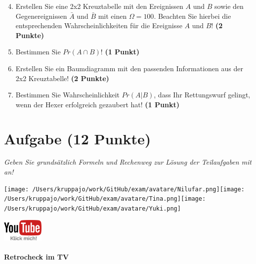 \documentclass[a4paper, 9pt]{scrartcl}\usepackage[]{graphicx}\usepackage[]{xcolor}
\begin{document}
\begin{enumerate}
  \setcounter{enumi}{3}
\item Erstellen Sie eine 2x2 Kreuztabelle mit den Ereignissen $A$ und $B$ sowie den Gegenereignissen $\bar{A}$ und $\bar{B}$ mit einen $\Omega = 100$. Beachten Sie hierbei die entsprechenden Wahrscheinlichkeiten für die Ereignisse $A$ und $B$! \textbf{(2 Punkte)}
\item Bestimmen Sie $Pr(A \cap B)$! \textbf{(1 Punkt)}
\item Erstellen Sie ein Baumdiagramm mit den passenden Informationen aus der 2x2 Kreuztabelle! \textbf{(2 Punkte)}
\item Bestimmen Sie Wahrscheinlichkeit $Pr(A|B)$, dass Ihr Rettungswurf gelingt, wenn der Hexer erfolgreich gezaubert hat! \textbf{(1 Punkt)}
\end{enumerate}

  
\clearpage

\section{Aufgabe \hfill (12 Punkte)}

\textit{Geben Sie grundsätzlich Formeln und Rechenweg zur Lösung der Teilaufgaben mit an!} \\[1Ex]
 

 
\begin{minipage}[t]{0.5\textwidth}
\texttt{[image: /Users/kruppajo/work/GitHub/exam/avatare/Nilufar.png]}\hspace{-4mm}\texttt{[image: /Users/kruppajo/work/GitHub/exam/avatare/Tina.png]}\hspace{-4mm}\texttt{[image: /Users/kruppajo/work/GitHub/exam/avatare/Yuki.png]}
\end{minipage}
\begin{minipage}[t]{0.5\textwidth}
\hfill
\href{https://youtu.be/8Pb2sKUIMyk}{\includegraphics[width = 2cm]{img/youtube}}
\end{minipage}




\paragraph{Retrocheck im TV}
\end{document}
